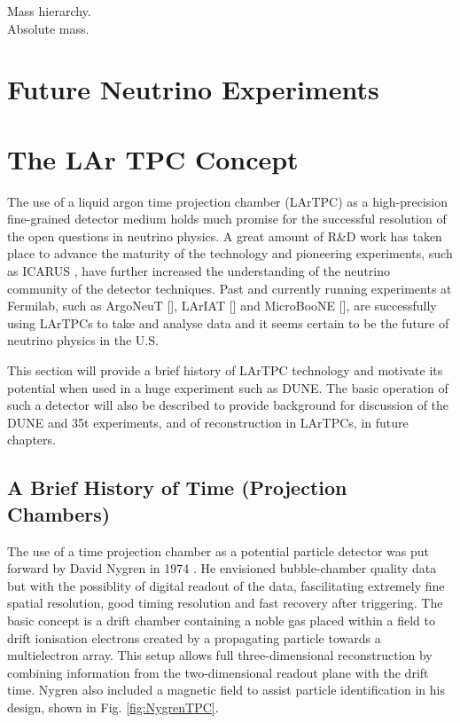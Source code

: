 Mass hierarchy.\\
Absolute mass.\\


\section{Future Neutrino Experiments}\label{sec:FutureNeutrinoExperiments}

\section{The LAr TPC Concept}\label{sec:LArTPC}

The use of a liquid argon time projection chamber (LArTPC) as a high-precision fine-grained detector medium holds much promise for the successful resolution of the open questions in neutrino physics.  A great amount of R\&D work has taken place to advance the maturity of the technology and pioneering experiments, such as ICARUS \cite{ICARUS2004}, have further increased the understanding of the neutrino community of the detector techniques.  Past and currently running experiments at Fermilab, such as ArgoNeuT [], LArIAT [] and MicroBooNE [], are successfully using LArTPCs to take and analyse data and it seems certain to be the future of neutrino physics in the U.S.

This section will provide a brief history of LArTPC technology and motivate its potential when used in a huge experiment such as DUNE.  The basic operation of such a detector will also be described to provide background for discussion of the DUNE and 35t experiments, and of reconstruction in LArTPCs, in future chapters.

\subsection{A Brief History of Time (Projection Chambers)}\label{sec:LArTPCHistory}

The use of a time projection chamber as a potential particle detector was put forward by David Nygren in 1974 \cite{Nygren1974}.  He envisioned bubble-chamber quality data but with the possiblity of digital readout of the data, fascilitating extremely fine spatial resolution, good timing resolution and fast recovery after triggering.  The basic concept is a drift chamber containing a noble gas placed within a field to drift ionisation electrons created by a propagating particle towards a multielectron array.  This setup allows full three-dimensional reconstruction by combining information from the two-dimensional readout plane with the drift time.  Nygren also included a magnetic field to assist particle identification in his design, shown in Fig. \ref{fig:NygrenTPC}.

